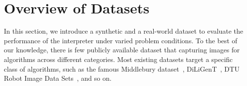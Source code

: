 
\section{Overview of Datasets}
\label{sec:dataset}
In this section, we introduce a synthetic and a real-world dataset to evaluate the performance of the interpreter under varied problem conditions. To the best of our knowledge, there is few publicly available dataset that capturing images for algorithms across different categories. Most existing datasets target a specific class of algorithms, such as the famous Middlebury dataset~\cite{seitz2006comparison}, DiLiGenT~\cite{shi2016benchmark}, DTU Robot Image Data Sets~\cite{jensen2014large}, and so on. 

